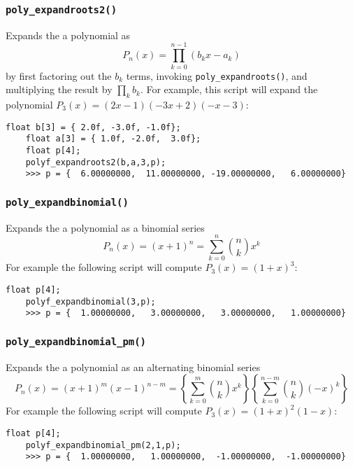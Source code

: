 \subsubsection{{\tt poly\_expandroots2()}}
\label{module:math:poly:polyf_expandroots2}
Expands the a polynomial as
%
\begin{equation}
\label{eqn:math:poly:expandroots2}
    P_n(x) = \prod_{k=0}^{n-1}{(b_kx-a_k)}
\end{equation}
%
by first factoring out the $b_k$ terms,
invoking {\tt poly\_expandroots()}, and
multiplying the result by $\prod_k{b_k}$.
For example, this script will expand the polynomial
$P_3(x) = (2x-1)(-3x+2)(-x-3)$:
%
\begin{Verbatim}[fontsize=\small]
    float b[3] = { 2.0f, -3.0f, -1.0f};
    float a[3] = { 1.0f, -2.0f,  3.0f};
    float p[4];
    polyf_expandroots2(b,a,3,p);
    >>> p = {  6.00000000,  11.00000000, -19.00000000,   6.00000000}
\end{Verbatim}
%

\subsubsection{{\tt poly\_expandbinomial()}}
\label{module:math:poly:polyf_expandbinomial}
Expands the a polynomial as a binomial series
%
\begin{equation}
\label{eqn:math:poly:expandbinomial}
    P_n(x) = (x+1)^n = \sum_{k=0}^{n}{ {n \choose k} x^k}
\end{equation}
%
For example the following script will compute
$P_3(x) = (1+x)^3$:
%
\begin{Verbatim}[fontsize=\small]
    float p[4];
    polyf_expandbinomial(3,p);
    >>> p = {  1.00000000,   3.00000000,   3.00000000,   1.00000000}
\end{Verbatim}
%

\subsubsection{{\tt poly\_expandbinomial\_pm()}}
\label{module:math:poly:polyf_expandbinomial_pm}
Expands the a polynomial as an alternating binomial series
%
\begin{equation}
\label{eqn:math:poly:expandbinomial_pm}
    P_n(x) = (x+1)^m (x-1)^{n-m}
           = \left\{ \sum_{k=0}^{m}  { {n \choose k}    x^k} \right\}
             \left\{ \sum_{k=0}^{n-m}{ {n \choose k} (-x)^k} \right\}
\end{equation}
%
For example the following script will compute
$P_3(x) = (1+x)^2(1-x)$:
%
\begin{Verbatim}[fontsize=\small]
    float p[4];
    polyf_expandbinomial_pm(2,1,p);
    >>> p = {  1.00000000,   1.00000000,  -1.00000000,  -1.00000000}
\end{Verbatim}
%


